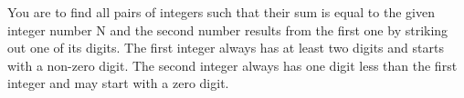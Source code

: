 You are to find all pairs of integers such that their sum is equal to the given integer number N and the second number results from the first one by striking out one of its digits. The first integer always has at least two digits and starts with a non-zero digit. The second integer always has one digit less than the first integer and may start with a zero digit.
